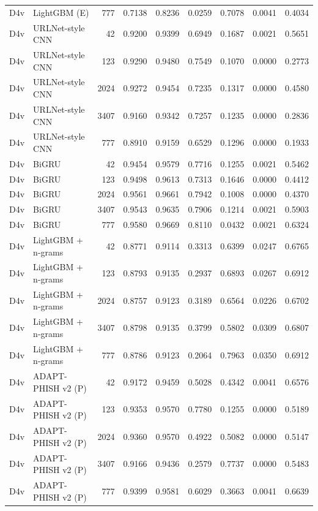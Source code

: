 \begin{table}[t]
\begin{tabular}{llrrrrrrr}
D4v & LightGBM (E) & 777 & 0.7138 & 0.8236 & 0.0259 & 0.7078 & 0.0041 & 0.4034 \\
D4v & URLNet-style CNN & 42 & 0.9200 & 0.9399 & 0.6949 & 0.1687 & 0.0021 & 0.5651 \\
D4v & URLNet-style CNN & 123 & 0.9290 & 0.9480 & 0.7549 & 0.1070 & 0.0000 & 0.2773 \\
D4v & URLNet-style CNN & 2024 & 0.9272 & 0.9454 & 0.7235 & 0.1317 & 0.0000 & 0.4580 \\
D4v & URLNet-style CNN & 3407 & 0.9160 & 0.9342 & 0.7257 & 0.1235 & 0.0000 & 0.2836 \\
D4v & URLNet-style CNN & 777 & 0.8910 & 0.9159 & 0.6529 & 0.1296 & 0.0000 & 0.1933 \\
D4v & BiGRU & 42 & 0.9454 & 0.9579 & 0.7716 & 0.1255 & 0.0021 & 0.5462 \\
D4v & BiGRU & 123 & 0.9498 & 0.9613 & 0.7313 & 0.1646 & 0.0000 & 0.4412 \\
D4v & BiGRU & 2024 & 0.9561 & 0.9661 & 0.7942 & 0.1008 & 0.0000 & 0.4370 \\
D4v & BiGRU & 3407 & 0.9543 & 0.9635 & 0.7906 & 0.1214 & 0.0021 & 0.5903 \\
D4v & BiGRU & 777 & 0.9580 & 0.9669 & 0.8110 & 0.0432 & 0.0021 & 0.6324 \\
D4v & LightGBM + n-grams & 42 & 0.8771 & 0.9114 & 0.3313 & 0.6399 & 0.0247 & 0.6765 \\
D4v & LightGBM + n-grams & 123 & 0.8793 & 0.9135 & 0.2937 & 0.6893 & 0.0267 & 0.6912 \\
D4v & LightGBM + n-grams & 2024 & 0.8757 & 0.9123 & 0.3189 & 0.6564 & 0.0226 & 0.6702 \\
D4v & LightGBM + n-grams & 3407 & 0.8798 & 0.9135 & 0.3799 & 0.5802 & 0.0309 & 0.6807 \\
D4v & LightGBM + n-grams & 777 & 0.8786 & 0.9123 & 0.2064 & 0.7963 & 0.0350 & 0.6912 \\
D4v & ADAPT-PHISH v2 (P) & 42 & 0.9172 & 0.9459 & 0.5028 & 0.4342 & 0.0041 & 0.6576 \\
D4v & ADAPT-PHISH v2 (P) & 123 & 0.9353 & 0.9570 & 0.7780 & 0.1255 & 0.0000 & 0.5189 \\
D4v & ADAPT-PHISH v2 (P) & 2024 & 0.9360 & 0.9570 & 0.4922 & 0.5082 & 0.0000 & 0.5147 \\
D4v & ADAPT-PHISH v2 (P) & 3407 & 0.9166 & 0.9436 & 0.2579 & 0.7737 & 0.0000 & 0.5483 \\
D4v & ADAPT-PHISH v2 (P) & 777 & 0.9399 & 0.9581 & 0.6029 & 0.3663 & 0.0041 & 0.6639 \\

\end{tabular}
\end{table}
